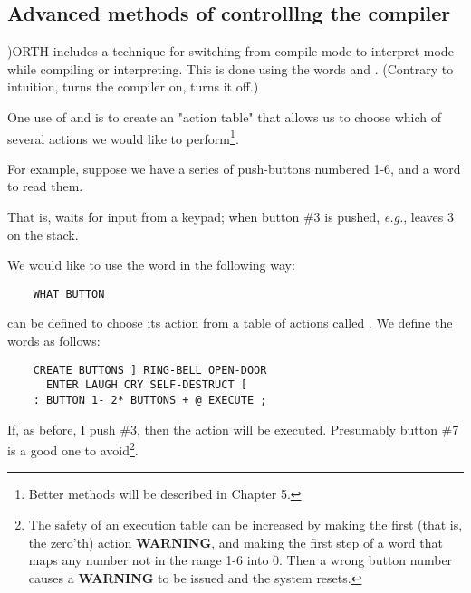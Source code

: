 \subsection{Advanced methods of controlllng the compiler}

){ORTH} includes a technique for switching from compile mode to interpret mode while compiling or interpreting. This is done using the words \bc{]} and \bc{[} . (Contrary to intuition, \bc{]} turns the compiler on, \bc{[} turns it off.)

One use of \bc{]} and \bc{[} is to create an "action table" that allows us to choose which of several actions we would like to perform\footnote{Better methods will be described in Chapter 5.}.

For example, suppose we have a series of push-buttons numbered 1-6, and a word  to read them.

That is,  waits for input from a keypad; when button \#3 is pushed, \textit{e.g.},  leaves 3 on the stack.

We would like to use the word  in the following way:

\begin{lstlisting}
    WHAT BUTTON
\end{lstlisting}

 can be defined to choose its action from a table of
actions called  . We define the words as follows:

\begin{lstlisting}
    CREATE BUTTONS ] RING-BELL OPEN-DOOR
      ENTER LAUGH CRY SELF-DESTRUCT [
    : BUTTON 1- 2* BUTTONS + @ EXECUTE ;
\end{lstlisting}

If, as before, I push \#3, then the action  will be executed. Presumably button \#7 is a good one to avoid\footnote{The safety of an execution table can be increased by making the first (that is, the zero’th) action \textbf{WARNING}, and making the first step of  a word  that maps any number not in the range 1-6 into 0. Then a wrong button number causes a \textbf{WARNING} to be issued and the system resets.}.

